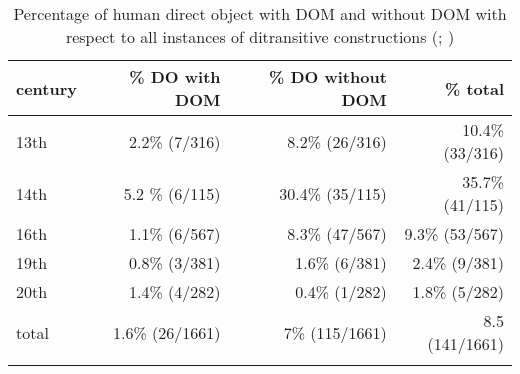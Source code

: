 \documentclass[output=paper]{LSP/langsci}
\begin{document}
\begin{table}
\caption{Percentage of human direct object with DOM and without DOM with respect to all instances of ditransitive constructions (\citealt[162]{Ortiz2011Construcciones}; \citealt[198]{Ortiz2005Objetos})}
\label{11-he-tab:6}

\begin{tabularx}{\textwidth}{Xrrr}
\lsptoprule

 century & \% DO with DOM & \% DO without DOM & \% total\\
\midrule
 13th & 2.2\% (7/316) & 8.2\% (26/316) & 10.4\% (33/316)\\
 14th & 5.2 \% (6/115) & 30.4\% (35/115) & 35.7\% (41/115)\\
 16th & 1.1\% (6/567) & 8.3\% (47/567) & 9.3\% (53/567)\\
 19th & 0.8\% (3/381) & 1.6\% (6/381) & 2.4\% (9/381)\\
 20th & 1.4\% (4/282) & 0.4\% (1/282) & 1.8\% (5/282)\\
\midrule
 total & 1.6\% (26/1661) & 7\% (115/1661) & 8.5 (141/1661)\\
\lspbottomrule
\end{tabularx}
\end{table}

%
%
\end{document}
